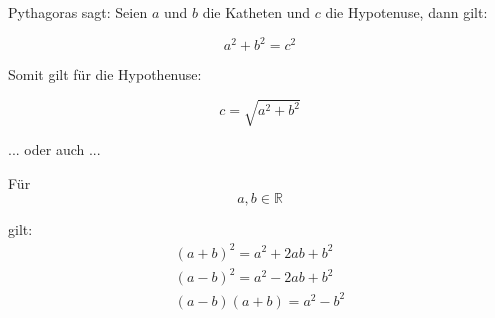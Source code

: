 
Pythagoras sagt: Seien $a$ und $b$ die Katheten und $c$ die
Hypotenuse, dann gilt: 

\begin{displaymath}
  a^2+b^2=c^2 
\end{displaymath}
 
Somit gilt für die Hypothenuse: 

\begin{displaymath}
  c=\sqrt{a^2+b^2} 
\end{displaymath}

\bigskip 
... oder auch ...
\bigskip 
\bigskip 

Für
\begin{displaymath}
a,b \in \mathbb{R}
\end{displaymath}

gilt: 
\begin{displaymath}
\begin{split}
(a+b)^{2} = a^{2} + 2ab + b^{2} \\
(a-b)^{2} = a^{2} - 2ab + b^{2} \\
(a-b)(a+b) = a^{2} - b^{2}
\end{split}
\end{displaymath}
